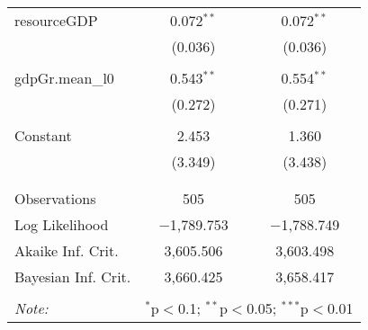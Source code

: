 \begin{table}[!htbp]
\begin{tabular}{@{\extracolsep{5pt}}lcc}
 resourceGDP & 0.072$^{**}$ & 0.072$^{**}$ \\ 
  & (0.036) & (0.036) \\ 
  & & \\ 
 gdpGr.mean\_l0 & 0.543$^{**}$ & 0.554$^{**}$ \\ 
  & (0.272) & (0.271) \\ 
  & & \\ 
 Constant & 2.453 & 1.360 \\ 
  & (3.349) & (3.438) \\ 
  & & \\ 
\hline \\[-1.8ex] 
Observations & 505 & 505 \\ 
Log Likelihood & $-$1,789.753 & $-$1,788.749 \\ 
Akaike Inf. Crit. & 3,605.506 & 3,603.498 \\ 
Bayesian Inf. Crit. & 3,660.425 & 3,658.417 \\ 
\hline 
\hline \\[-1.8ex] 
\textit{Note:}  & \multicolumn{2}{r}{$^{*}$p$<$0.1; $^{**}$p$<$0.05; $^{***}$p$<$0.01} \\ 
\end{tabular} 
\end{table}  

